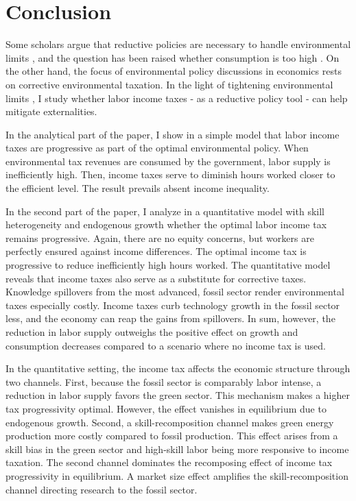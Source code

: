 \section{Conclusion}\label{sec:con}
Some scholars argue that  reductive policies are necessary to handle environmental limits \citep{Schor2005SustainableReduction}, and the question has been raised whether consumption is too high \citep{Arrow2004AreMuch}. On the other hand, the focus of environmental policy discussions in economics rests on corrective environmental taxation. In the light of tightening environmental limits \citep{Rockstrom2009AHumanity, IPCC2022}, I study whether labor income taxes - as a reductive policy tool - can help mitigate externalities. 

In the analytical part of the paper, I show in a simple model that labor income taxes are  progressive as part of the optimal environmental policy. %
When environmental tax revenues are consumed by the government, labor supply is inefficiently high. Then, income taxes serve to diminish hours worked closer to the efficient level. The result prevails absent income inequality.


In the second part of the paper, I analyze in a quantitative model with skill heterogeneity and endogenous growth whether the optimal labor income tax remains progressive. Again, there are no equity concerns, but workers are perfectly ensured against income differences. 
The optimal income tax is progressive to reduce inefficiently high hours worked. The quantitative model reveals that income taxes also serve as a substitute for corrective taxes. Knowledge spillovers from the most advanced, fossil sector render environmental taxes especially costly. Income taxes curb technology growth in the fossil sector less, and the economy can reap the gains from spillovers. In sum, however, the reduction in labor supply outweighs the positive effect on growth and consumption decreases compared to a scenario where no income tax is used. 

In the quantitative setting, the income tax affects the economic structure through two channels. First, because the fossil sector is comparably labor intense, a reduction in labor supply favors the green sector. This mechanism makes a higher tax progressivity optimal. However, the effect vanishes in equilibrium due to endogenous growth.
Second, a skill-recomposition channel makes green energy production more costly compared to fossil production. This effect arises from a skill bias in the green sector and high-skill labor being more responsive to income taxation. 
The second channel dominates the recomposing effect of  income tax progressivity in equilibrium. A market size effect amplifies the skill-recomposition channel directing research to the fossil sector. 

